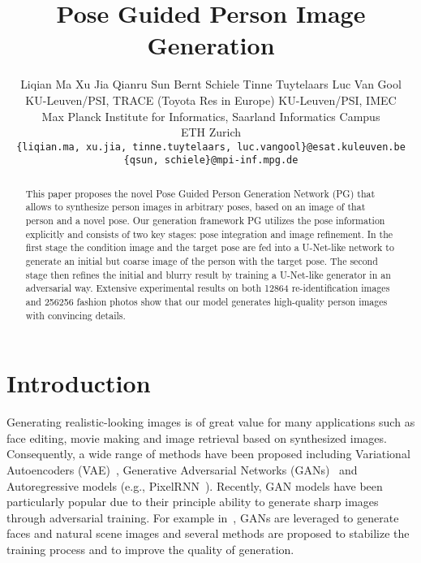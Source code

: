 \documentclass{article}
\title{Pose Guided Person Image Generation}
\author{Liqian Ma \quad Xu Jia \quad Qianru Sun \quad Bernt Schiele \quad Tinne Tuytelaars  \quad Luc Van Gool \\
  KU-Leuven/PSI, TRACE (Toyota Res in Europe) \quad
  KU-Leuven/PSI, IMEC \\
  Max Planck Institute for Informatics, Saarland Informatics Campus \\ ETH Zurich \\
  {\texttt{\{liqian.ma, xu.jia, tinne.tuytelaars,
luc.vangool\}@esat.kuleuven.be}} \\
  {\texttt{\{qsun, schiele\}@mpi-inf.mpg.de}} \quad {\texttt{vangool@vision.ee.ethz.ch}}
}
\begin{document}
\maketitle

\begin{abstract}
\vspace{-0.2cm}
This paper proposes the novel Pose Guided Person Generation Network (PG) that allows to synthesize person images in arbitrary poses, based on an image of that person and a novel pose. Our generation framework PG utilizes the pose information explicitly and consists of two key stages: pose integration and image refinement. In the first stage the condition image and the target pose are fed into a U-Net-like network to generate an initial but coarse image of the person with the target pose. The second stage then refines the initial and blurry result by training a U-Net-like generator in an adversarial way. Extensive experimental results on both 12864 re-identification images and 256256 fashion photos show that our model generates high-quality person images with convincing details.

\end{abstract}



\section{Introduction}
\label{intro}

Generating realistic-looking images is of great value for many applications such as face editing, movie making and image retrieval based on synthesized images.
Consequently, a wide range of methods have been proposed
including Variational Autoencoders (VAE)~\cite{VariationalAE}, Generative Adversarial Networks (GANs)~\cite{GAN-2014nips} and Autoregressive models (e.g., PixelRNN~\cite{Oord2016-pixelRNN}). Recently, GAN models have been particularly popular due to their principle ability to generate sharp images through adversarial training.
For example in~\cite{Radford2015-DCGAN,InfoGAN,WGAN}, GANs are leveraged to generate faces and natural scene images and several methods are proposed to stabilize the training process and to improve the quality of generation. 
\end{document}
